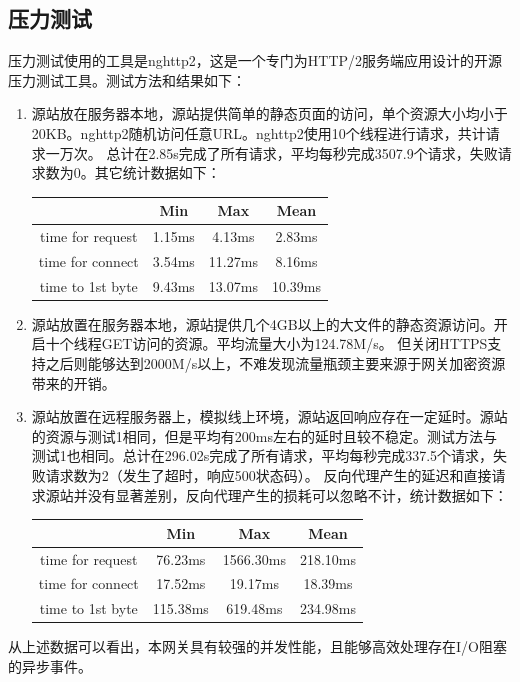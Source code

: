 \documentclass[twoside]{CUGThesis}
\begin{document}
	\subsection{压力测试}
	压力测试使用的工具是nghttp2，这是一个专门为HTTP/2服务端应用设计的开源压力测试工具。测试方法和结果如下：\par 
	\begin{enumerate}
	\item 源站放在服务器本地，源站提供简单的静态页面的访问，单个资源大小均小于20KB。nghttp2随机访问任意URL。nghttp2使用10个线程进行请求，共计请求一万次。
	总计在2.85s完成了所有请求，平均每秒完成3507.9个请求，失败请求数为0。其它统计数据如下：
	\begin{center}
	\begin{tabular}{|c|c|c|c|} 
		\hline
		 \ & Min & Max & Mean  \\ \hline
		time for request & 1.15ms  & 4.13ms & 2.83ms \\ \hline
		time for connect & 3.54ms & 11.27ms & 8.16ms \\ \hline
		time to 1st byte & 9.43ms  & 13.07ms & 10.39ms \\
		\hline
	\end{tabular}
	\end{center}
	\item 源站放置在服务器本地，源站提供几个4GB以上的大文件的静态资源访问。开启十个线程GET访问的资源。平均流量大小为124.78M/s。
	但关闭HTTPS支持之后则能够达到2000M/s以上，不难发现流量瓶颈主要来源于网关加密资源带来的开销。
	\item 源站放置在远程服务器上，模拟线上环境，源站返回响应存在一定延时。源站的资源与测试1相同，但是平均有200ms左右的延时且较不稳定。测试方法与
	测试1也相同。总计在296.02s完成了所有请求，平均每秒完成337.5个请求，失败请求数为2（发生了超时，响应500状态码）。
	反向代理产生的延迟和直接请求源站并没有显著差别，反向代理产生的损耗可以忽略不计，统计数据如下：
	\begin{center}
		\begin{tabular}{|c|c|c|c|} 
			\hline
			 \ & Min & Max & Mean  \\ \hline
			time for request & 76.23ms  & 1566.30ms & 218.10ms \\ \hline
			time for connect & 17.52ms & 19.17ms & 18.39ms \\ \hline
			time to 1st byte & 115.38ms  & 619.48ms & 234.98ms \\
			\hline
		\end{tabular}
		\end{center}
	\end{enumerate}
	\par
	从上述数据可以看出，本网关具有较强的并发性能，且能够高效处理存在I/O阻塞的异步事件。
\end{document}
